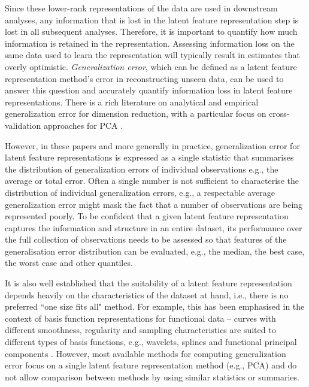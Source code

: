 Since these lower-rank representations of the data are used in downstream analyses, any information that is lost in the latent feature representation step is lost in all subsequent analyses. 
Therefore, it is important to quantify how much information is retained in the representation. 
Assessing information loss on the same data used to learn the representation will typically result in estimates that overly optimistic.
\emph{Generalization error}, which can be defined as a latent feature representation method's error in reconstructing unseen data, can be used to answer this question and accurately quantify information loss in latent feature representations. 
There is a rich literature on analytical and empirical generalization error for dimension reduction, with a particular focus on cross-validation approaches for PCA \parencite[see, e.g.,][]{becht_dimensionality_2019, wold_cross-validatory_1978, eastment_cross-validatory_1982,krzanowski_cross-validation_1987, minka_automatic_2000, rajan_bayesian_1994, camacho_cross-validation_2014, diana_cross-validation_2002, hubert_fast_2007, josse_selecting_2012, saccenti_use_2015}.

However, in these papers and more generally in practice, generalization error for latent feature representations is expressed as a single statistic that summarises the distribution of generalization errors of individual observations e.g., the average or total error.
Often a single number is not sufficient to characterise the distribution of individual generalization errors, e.g., a respectable average generalization error might mask the fact that a number of observations are being represented poorly. 
To be confident that a given latent feature representation captures the information and structure in an entire dataset, its performance over the full collection of observations needs to be assessed so that features of the generalisation error distribution can be evaluated, e.g., the median, the best case, the worst case and other quantiles.

It is also well established that the suitability of a latent feature representation depends heavily on the characteristics of the dataset at hand, i.e., there is no preferred ``one size fits all" method.
For example, this has been emphasised in the context of basis function representations for functional data -- curves with different smoothness, regularity and sampling characteristics are suited to different types of basis functions, e.g., wavelets, splines and functional principal components \textcite[Section 3, pp. 325--328]{morris_functional_2015}.
However, most available methods for computing generalization error focus on a single latent feature representation method (e.g., PCA) and do not allow comparison between methods by using similar statistics or summaries.

